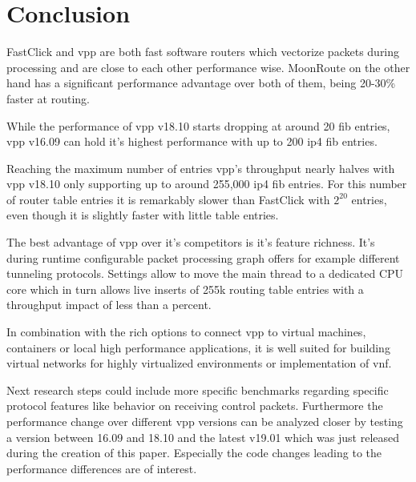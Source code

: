 \chapter{Conclusion}

FastClick and \Ac{vpp} are both fast software routers which vectorize
packets during processing and are close to each other performance
wise. MoonRoute on the other hand has a significant performance
advantage over both of them, being 20-30\% faster at routing.

While the performance of \Ac{vpp} v18.10 starts dropping at around 20
\Ac{fib} entries, \Ac{vpp} v16.09 can hold it's highest performance
with up to 200 \Ac{ip4} \Ac{fib} entries. 

Reaching the maximum number of entries \Ac{vpp}'s throughput nearly
halves with \Ac{vpp} v18.10 only supporting up to around 255,000
\Ac{ip4} \Ac{fib} entries. For this number of router table entries it
is remarkably slower than FastClick with $2^{20}$ entries, even though
it is slightly faster with little table entries.

The best advantage of \Ac{vpp} over it's competitors is it's feature
richness. It's during runtime configurable packet processing graph
offers for example different tunneling protocols. Settings allow to
move the main thread to a dedicated CPU core which in turn allows live
inserts of 255k routing table entries with a throughput impact of less
than a percent.

In combination with the rich options to connect \Ac{vpp} to virtual
machines, containers or local high performance applications, it is
well suited for building virtual networks for highly virtualized
environments or implementation of \Ac{vnf}.

Next research steps could include more specific benchmarks regarding
specific protocol features like behavior on receiving control packets.
Furthermore the performance change over different \Ac{vpp} versions
can be analyzed closer by testing a version between 16.09 and 18.10
and the latest v19.01 which was just released during the creation of
this paper. Especially the code changes leading to the performance
differences are of interest.
